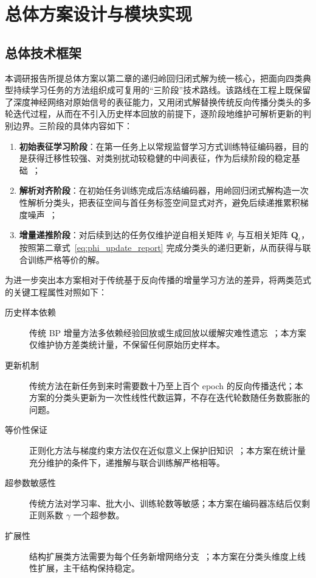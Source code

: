 
\chapter{总体方案设计与模块实现}

\section{总体技术框架}

本调研报告所提总体方案以第二章的递归岭回归闭式解为统一核心，把面向四类典型持续学习任务的方法组织成可复用的“三阶段”技术路线。该路线在工程上既保留了深度神经网络对原始信号的表征能力，又用闭式解替换传统反向传播分类头的多轮迭代过程，从而在不引入历史样本回放的前提下，逐阶段地维护可解析更新的判别边界。三阶段的具体内容如下：
\begin{enumerate}
    \item \textbf{初始表征学习阶段}：在第一任务上以常规监督学习方式训练特征编码器，目的是获得迁移性较强、对类别扰动较稳健的中间表征，作为后续阶段的稳定基础~\citep{he2016resnet,chen2017deeplabv3}；
    \item \textbf{解析对齐阶段}：在初始任务训练完成后冻结编码器，用岭回归闭式解构造一次性解析分类头，把表征空间与首任务标签空间显式对齐，避免后续递推累积梯度噪声~\citep{zhuang2022acil,mcdonnell2023ranpac}；
    \item \textbf{增量递推阶段}：对后续到达的任务仅维护逆自相关矩阵 $\Psi_t$ 与互相关矩阵 $\mathbf{Q}_t$，按照第二章式~\eqref{eq:phi_update_report} 完成分类头的递归更新，从而获得与联合训练严格等价的解。
\end{enumerate}

为进一步突出本方案相对于传统基于反向传播的增量学习方法的差异，将两类范式的关键工程属性对照如下：
\begin{description}
    \item[历史样本依赖] 传统 BP 增量方法多依赖经验回放或生成回放以缓解灾难性遗忘~\citep{rebuffi2017icarl,shin2017continual,buzzega2020dark}；本方案仅维护协方差类统计量，不保留任何原始历史样本。
    \item[更新机制] 传统方法在新任务到来时需要数十乃至上百个 epoch 的反向传播迭代；本方案的分类头更新为一次性线性代数运算，不存在迭代轮数随任务数膨胀的问题。
    \item[等价性保证] 正则化方法与梯度约束方法仅在近似意义上保护旧知识~\citep{kirkpatrick2017ewc,li2017learning,lopez2017gradient}；本方案在统计量充分维护的条件下，递推解与联合训练解严格相等。
    \item[超参数敏感性] 传统方法对学习率、批大小、训练轮数等敏感；本方案在编码器冻结后仅剩正则系数 $\gamma$ 一个超参数。
    \item[扩展性] 结构扩展类方法需要为每个任务新增网络分支~\citep{rusu2016progressive,mallya2018piggyback}；本方案在分类头维度上线性扩展，主干结构保持稳定。
\end{description}

